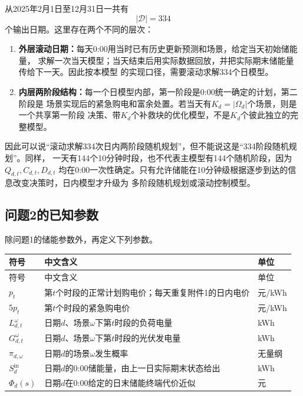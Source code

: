 \documentclass[UTF8,11pt]{ctexart}
\begin{document}
从2025年2月1日至12月31日一共有
\begin{equation}
    |\mathcal D|=334
\end{equation}
个输出日期。这里存在两个不同的层次：
\begin{enumerate}[label=(\arabic*)]
    \item \textbf{外层滚动日期：}每天0:00用当时已有历史更新预测和场景，给定当天初始储能量，
    求解一次当天模型；当天结束后用实际数据回放，并把实际期末储能量传给下一天。因此按本模型
    的实现口径，需要滚动求解334个日模型。
    \item \textbf{内层两阶段结构：}每一个日模型内部，第一阶段是0:00统一确定的计划，第二阶段是
    场景实现后的紧急购电和富余处置。若当天有$K_d=|\Omega_d|$个场景，则是一个共享第一阶段
    决策、带$K_d$个补救块的优化模型，不是$K_d$个彼此独立的完整模型。
\end{enumerate}
因此可以说“滚动求解334次日内两阶段随机规划”，但不能说这是“334阶段随机规划”。同样，
一天有144个10分钟时段，也不代表主模型有144个随机阶段，因为$Q_{d,t},C_{d,t},D_{d,t}$
均在0:00一次性确定。只有允许储能在10分钟级根据逐步到达的信息改变决策时，日内模型才升级为
多阶段随机规划或滚动控制模型。

\subsection{问题2的已知参数}

除问题1的储能参数外，再定义下列参数。

\begin{longtable}{>{\centering\arraybackslash}p{3.0cm}p{7.0cm}p{2.2cm}}
\toprule
符号 & 中文含义 & 单位 \\
\midrule
\endfirsthead
\toprule
符号 & 中文含义 & 单位 \\
\midrule
\endhead
$p_t$ & 第$t$个时段的正常计划购电价；每天重复附件1的日内电价 & 元/kWh \\
$5p_t$ & 第$t$个时段的紧急购电价 & 元/kWh \\
$L^{\omega}_{d,t}$ & 日期$d$、场景$\omega$下第$t$时段的负荷电量 & kWh \\
$G^{\omega}_{d,t}$ & 日期$d$、场景$\omega$下第$t$时段的光伏发电量 & kWh \\
$\pi_{d,\omega}$ & 日期$d$的场景$\omega$发生概率 & 无量纲 \\
$S^{\mathrm{in}}_d$ & 日期$d$的0:00储能量，由上一日实际期末状态给出 & kWh \\
$\Phi_d(s)$ & 日期$d$在0:00给定的日末储能终端代价近似 & 元 \\
\bottomrule
\end{longtable}
\end{document}
